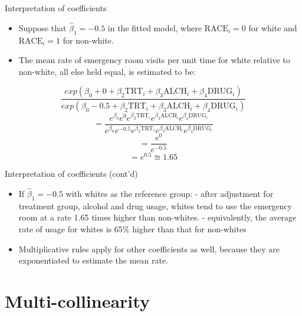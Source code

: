 \documentclass[ignorenonframetext,]{beamer}
\providecommand{\tightlist}{%
  \setlength{\itemsep}{0pt}\setlength{\parskip}{0pt}}
\begin{document}
\begin{frame}{Interpretation of coefficients}
\protect\hypertarget{interpretation-of-coefficients}{}

\begin{itemize}
\tightlist
\item
  Suppose that \(\hat \beta_1 = -0.5\) in the fitted model, where
  \(\textrm{RACE}_i=0\) for white and \(\textrm{RACE}_i=1\) for
  non-white.
\item
  The mean rate of emergency room visits per unit time for white
  relative to non-white, all else held equal, is estimated to be:
\end{itemize}

\[
\frac{exp \left( \beta_0 + 0 + \beta_2 \textrm{TRT}_i + \beta_3 \textrm{ALCH}_i + \beta_4 \textrm{DRUG}_i \right)}{exp \left( \beta_0 - 0.5 + \beta_2 \textrm{TRT}_i + \beta_3 \textrm{ALCH}_i + \beta_4 \textrm{DRUG}_i \right)}
\] \[
= \frac{e^{\beta_0} e^0 e^{\beta_2 \textrm{TRT}_i} e^{\beta_3 \textrm{ALCH}_i} e^{\beta_4 \textrm{DRUG}_i}}
{e^{\beta_0} e^{-0.5} e^{\beta_2 \textrm{TRT}_i} e^{\beta_3 \textrm{ALCH}_i} e^{\beta_4 \textrm{DRUG}_i}}
\] \[
= \frac{e^0}{e^{-0.5}}
\] \[
= e^{0.5} \approxeq 1.65
\]

\end{frame}

\begin{frame}{Interpretation of coefficients (cont'd)}
\protect\hypertarget{interpretation-of-coefficients-contd}{}

\begin{itemize}
\tightlist
\item
  If \(\hat \beta_1=-0.5\) with whites as the reference group: - after
  adjustment for treatment group, alcohol and drug usage, whites tend to
  use the emergency room at a rate 1.65 times higher than non-whites. -
  equivalently, the average rate of usage for whites is 65\% higher than
  that for non-whites
\item
  Multiplicative rules apply for other coefficients as well, because
  they are exponentiated to estimate the mean rate.
\end{itemize}

\end{frame}

\hypertarget{multi-collinearity}{%
\section{Multi-collinearity}\label{multi-collinearity}}
\end{document}
